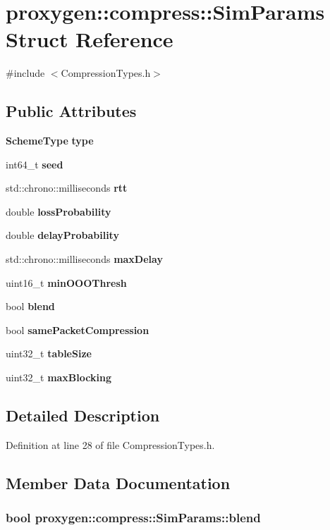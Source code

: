 \section{proxygen\+:\+:compress\+:\+:Sim\+Params Struct Reference}
\label{structproxygen_1_1compress_1_1SimParams}


{\ttfamily \#include $<$Compression\+Types.\+h$>$}

\subsection*{Public Attributes}
\begin{DoxyCompactItemize}
\item 
{\bf Scheme\+Type} {\bf type}
\item 
int64\+\_\+t {\bf seed}
\item 
std\+::chrono\+::milliseconds {\bf rtt}
\item 
double {\bf loss\+Probability}
\item 
double {\bf delay\+Probability}
\item 
std\+::chrono\+::milliseconds {\bf max\+Delay}
\item 
uint16\+\_\+t {\bf min\+O\+O\+O\+Thresh}
\item 
bool {\bf blend}
\item 
bool {\bf same\+Packet\+Compression}
\item 
uint32\+\_\+t {\bf table\+Size}
\item 
uint32\+\_\+t {\bf max\+Blocking}
\end{DoxyCompactItemize}


\subsection{Detailed Description}


Definition at line 28 of file Compression\+Types.\+h.



\subsection{Member Data Documentation}
\subsubsection[{blend}]{\setlength{\rightskip}{0pt plus 5cm}bool proxygen\+::compress\+::\+Sim\+Params\+::blend}\label{structproxygen_1_1compress_1_1SimParams_aa3f2bd9da4405f9d388c57f37d507175}



